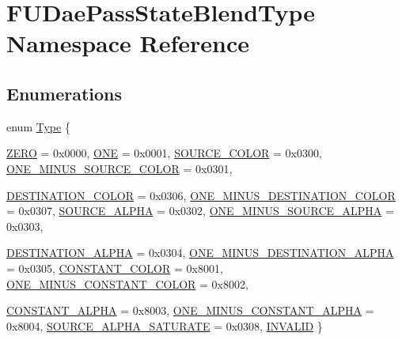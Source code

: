 \hypertarget{namespaceFUDaePassStateBlendType}{
\section{FUDaePassStateBlendType Namespace Reference}
\label{namespaceFUDaePassStateBlendType}
}
\subsection*{Enumerations}
\begin{DoxyCompactItemize}
\item 
enum \hyperlink{namespaceFUDaePassStateBlendType_a8b19ecfbd7f27a60a30af883541b62b8}{Type} \{ \par
\hyperlink{namespaceFUDaePassStateBlendType_a8b19ecfbd7f27a60a30af883541b62b8a4c64733312805a62bb0931393fd8206e}{ZERO} =  0x0000, 
\hyperlink{namespaceFUDaePassStateBlendType_a8b19ecfbd7f27a60a30af883541b62b8ab61a985cfda35bf81d2336255f7e8c54}{ONE} =  0x0001, 
\hyperlink{namespaceFUDaePassStateBlendType_a8b19ecfbd7f27a60a30af883541b62b8a4d70dc3a3ccd363604c75eb6685d1571}{SOURCE\_\-COLOR} =  0x0300, 
\hyperlink{namespaceFUDaePassStateBlendType_a8b19ecfbd7f27a60a30af883541b62b8a0dd62ed9c7faeb1afb0d373076dea4f8}{ONE\_\-MINUS\_\-SOURCE\_\-COLOR} =  0x0301, 
\par
\hyperlink{namespaceFUDaePassStateBlendType_a8b19ecfbd7f27a60a30af883541b62b8a46b14ebd701f3ebc6f71c942dffb525d}{DESTINATION\_\-COLOR} =  0x0306, 
\hyperlink{namespaceFUDaePassStateBlendType_a8b19ecfbd7f27a60a30af883541b62b8acac35f49867940b8d6efd966eea464a7}{ONE\_\-MINUS\_\-DESTINATION\_\-COLOR} =  0x0307, 
\hyperlink{namespaceFUDaePassStateBlendType_a8b19ecfbd7f27a60a30af883541b62b8aaf69f2e64c653f2129fe73c4d9435365}{SOURCE\_\-ALPHA} =  0x0302, 
\hyperlink{namespaceFUDaePassStateBlendType_a8b19ecfbd7f27a60a30af883541b62b8a9ecc087e8be469a5c0451dc2f006e19c}{ONE\_\-MINUS\_\-SOURCE\_\-ALPHA} =  0x0303, 
\par
\hyperlink{namespaceFUDaePassStateBlendType_a8b19ecfbd7f27a60a30af883541b62b8a78ef6d91f83af6a314ba5194ba19a04b}{DESTINATION\_\-ALPHA} =  0x0304, 
\hyperlink{namespaceFUDaePassStateBlendType_a8b19ecfbd7f27a60a30af883541b62b8ab0923e611d55cc0997425e3694034450}{ONE\_\-MINUS\_\-DESTINATION\_\-ALPHA} =  0x0305, 
\hyperlink{namespaceFUDaePassStateBlendType_a8b19ecfbd7f27a60a30af883541b62b8ae4c41954b1916ffe5786cc1f3307bb7c}{CONSTANT\_\-COLOR} =  0x8001, 
\hyperlink{namespaceFUDaePassStateBlendType_a8b19ecfbd7f27a60a30af883541b62b8a8f922419715585a2e0eb2ca354884d4b}{ONE\_\-MINUS\_\-CONSTANT\_\-COLOR} =  0x8002, 
\par
\hyperlink{namespaceFUDaePassStateBlendType_a8b19ecfbd7f27a60a30af883541b62b8abbdf3bc2825625cb9df3c8a4ffe8c6e7}{CONSTANT\_\-ALPHA} =  0x8003, 
\hyperlink{namespaceFUDaePassStateBlendType_a8b19ecfbd7f27a60a30af883541b62b8a052fd9f7b61c336dbf28f4a0e4a6c174}{ONE\_\-MINUS\_\-CONSTANT\_\-ALPHA} =  0x8004, 
\hyperlink{namespaceFUDaePassStateBlendType_a8b19ecfbd7f27a60a30af883541b62b8a516295138693a3d478dc7b97b9c21b9e}{SOURCE\_\-ALPHA\_\-SATURATE} =  0x0308, 
\hyperlink{namespaceFUDaePassStateBlendType_a8b19ecfbd7f27a60a30af883541b62b8acb680b20c93e83cd0471327bc78404d5}{INVALID}
 \}
\end{DoxyCompactItemize}
